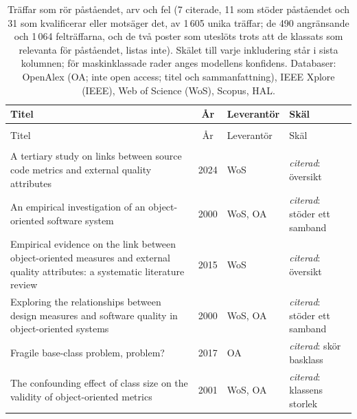 
\begingroup\footnotesize
\begin{longtable}{@{}%
  >{\raggedright\arraybackslash}p{}c%
  >{\raggedright\arraybackslash}p{}%
  >{\raggedright\arraybackslash}p{}@{}}
\caption{Träffar som rör påståendet, arv och fel (7 citerade, 11 som stöder påståendet och 31 som kvalificerar eller motsäger det, av 1\,605 unika träffar; de 490 angränsande och 1\,064 felträffarna, och de två poster som uteslöts trots att de klassats som relevanta för påståendet, listas inte). Skälet till varje inkludering står i sista kolumnen; för maskinklassade rader anges modellens konfidens. Databaser: OpenAlex (OA; inte open access; titel och sammanfattning), IEEE Xplore (IEEE), Web of Science (WoS), Scopus, HAL.}\label{tab:sok-arv-fel}\\
\toprule
Titel & År & Leverantör & Skäl \\
\midrule
\endfirsthead
\multicolumn{4}{@{}l}{\emph{\tablename~\thetable{} (forts.)}}\\
\toprule
Titel & År & Leverantör & Skäl \\
\midrule
\endhead
\midrule \multicolumn{4}{r@{}}{\emph{forts.\ på nästa sida}}\\
\endfoot
\bottomrule
\endlastfoot
A tertiary study on links between source code metrics and external quality attributes & 2024 & WoS & \emph{citerad}: översikt \\
An empirical investigation of an object-oriented software system & 2000 & WoS, OA & \emph{citerad}: stöder ett samband \\
Empirical evidence on the link between object-oriented measures and external quality attributes: a systematic literature review & 2015 & WoS & \emph{citerad}: översikt \\
Exploring the relationships between design measures and software quality in object-oriented systems & 2000 & WoS, OA & \emph{citerad}: stöder ett samband \\
Fragile base-class problem, problem? & 2017 & OA & \emph{citerad}: skör basklass \\
The confounding effect of class size on the validity of object-oriented metrics & 2001 & WoS, OA & \emph{citerad}: klassens storlek \\

\end{longtable}
